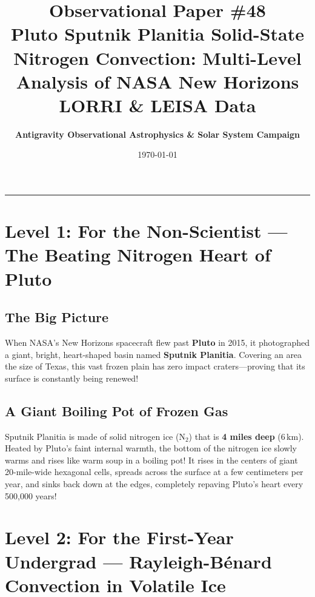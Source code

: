 \documentclass[11pt,a4paper]{article}
\title{\Huge \textbf{Observational Paper \#48}\\ \Large Pluto Sputnik Planitia Solid-State Nitrogen Convection: Multi-Level Analysis of NASA New Horizons LORRI \& LEISA Data}
\author{\textbf{Antigravity Observational Astrophysics \& Solar System Campaign}}
\date{\today}
\begin{document}
\maketitle

\vspace{-1em}
\begin{center}
\rule{\textwidth}{1.5pt}
\end{center}

\section*{Level 1: For the Non-Scientist — The Beating Nitrogen Heart of Pluto}

\subsection*{The Big Picture}
When NASA's New Horizons spacecraft flew past \textbf{Pluto} in 2015, it photographed a giant, bright, heart-shaped basin named \textbf{Sputnik Planitia}. Covering an area the size of Texas, this vast frozen plain has zero impact craters—proving that its surface is constantly being renewed!

\subsection*{A Giant Boiling Pot of Frozen Gas}
Sputnik Planitia is made of solid nitrogen ice ($\mathrm{N_2}$) that is \textbf{4 miles deep} ($6\,\text{km}$). Heated by Pluto's faint internal warmth, the bottom of the nitrogen ice slowly warms and rises like warm soup in a boiling pot! It rises in the centers of giant 20-mile-wide hexagonal cells, spreads across the surface at a few centimeters per year, and sinks back down at the edges, completely repaving Pluto's heart every 500,000 years!

\newpage

\section*{Level 2: For the First-Year Undergrad — Rayleigh-Bénard Convection in Volatile Ice}
\end{document}
